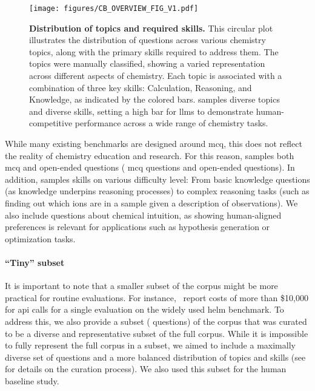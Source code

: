 \documentclass[11pt, oneside]{article}
\begin{document}
\begin{refsection}
\begin{figure}[!htb]
    \centering
    \texttt{[image: figures/CB\_OVERVIEW\_FIG\_V1.pdf]}
    \caption{\textbf{Distribution of topics and required skills.} This circular plot illustrates the distribution of questions across various chemistry topics, along with the primary skills required to address them. The topics were manually classified, showing a varied representation across different aspects of chemistry. Each topic is associated with a combination of three key skills: Calculation, Reasoning, and Knowledge, as indicated by the colored bars. \chembench samples diverse topics and diverse skills, setting a high bar for \glspl{llm} to demonstrate human-competitive performance across a wide range of chemistry tasks.}
    \label{fig:corpus}
\end{figure}


While many existing benchmarks are designed around \gls{mcq}, this does not reflect the reality of chemistry education and research.
For this reason, \chembench samples both \gls{mcq} and open-ended questions ( \gls{mcq} questions and  open-ended questions). In addition, \chembench samples skills on various difficulty level: From basic knowledge questions (as knowledge underpins reasoning processes\autocite{hu2024towards}) to complex reasoning tasks (such as finding out which ions are in a sample given a description of observations). We also include questions about chemical intuition, as showing human-aligned preferences is relevant for applications such as hypothesis generation or optimization tasks.\autocite{zhang2024omniopenendednessmodelshuman}


\paragraph{\enquote{Tiny} subset}
It is important to note that a smaller subset of the corpus might be more practical for routine evaluations.\autocite{polo2024tinybenchmarks}
For instance,~\textcite{liang2023holistic} report costs of more than \$10,000 for \gls{api} calls for a single evaluation on the widely used \gls{helm} benchmark.
To address this, we also provide a subset ( questions) of the corpus that was curated to be a diverse and representative subset of the full corpus. While it is impossible to fully represent the full corpus in a subset, we aimed to include a maximally diverse set of questions and a more balanced distribution of topics and skills (see  for details on the curation process).
We also used this subset for the human baseline study.




\end{refsection}
\end{document}
